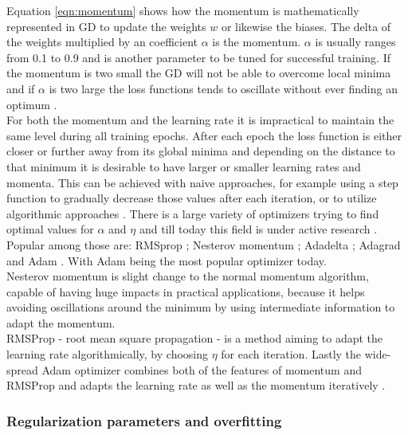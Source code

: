 Equation \ref{eqn:momentum} shows how the momentum is mathematically represented in GD to update the
weights $w$ or likewise the biases. The delta of the weights multiplied by an coefficient $\alpha$
is the momentum. $\alpha$ is usually ranges from 0.1 to 0.9 and is another parameter to be tuned for
successful training. If the momentum is two small the GD will not be able to overcome local minima
and if $\alpha$ is two large the loss functions tends to oscillate without ever finding an optimum \cite{lecun2015deep}. \\
For both the momentum and the learning rate it is impractical to maintain the same level during all
training epochs. After each epoch the loss function is either closer or further away from its global
minima and depending on the distance to that minimum it is desirable to have larger or smaller
learning rates and momenta. This can be achieved with naive approaches, for example using a step
function to gradually decrease those values after each iteration, or to utilize algorithmic
approaches \cite{michie1994machine}. There is a large variety of optimizers trying to find optimal
values for $\alpha$ and $\eta$ and till today this field is under active research
\cite{goodfellow2016deep}. Popular among those are: RMSprop \cite{hinton2012neural}; Nesterov
momentum \cite{dozat2016incorporating}; Adadelta \cite{zeiler2012adadelta}; Adagrad
\cite{ruder2016overview} and Adam \cite{kingma2014adam}. With Adam being the most popular
optimizer today. \\
Nesterov momentum is slight change to the normal momentum algorithm, capable of having huge impacts in practical applications, because it helps avoiding oscillations around the minimum by using intermediate information to adapt the momentum. \\
RMSProp - root mean square propagation - is a method aiming to adapt the learning rate
algorithmically, by choosing $\eta$ for each iteration. Lastly the wide-spread Adam optimizer
combines both of the features of momentum and RMSProp and adapts the learning rate as well as the
momentum iteratively \cite{kingma2014adam}.

\subsubsection{Regularization parameters and overfitting}

